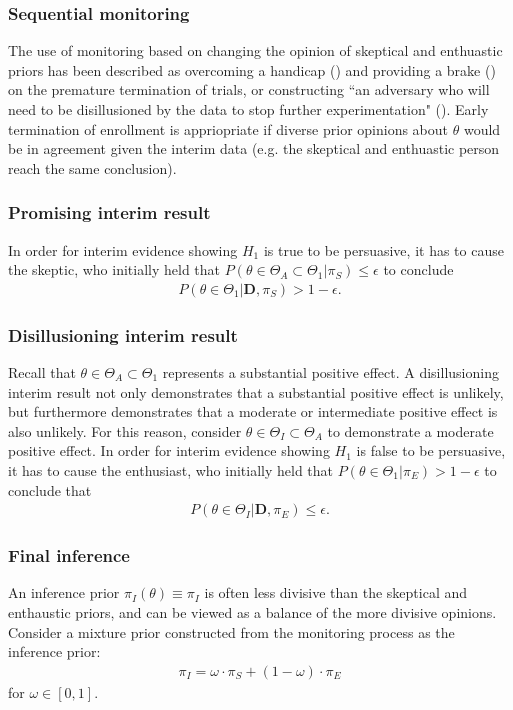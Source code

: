 \documentclass[12pt]{article}
\begin{document}
\subsubsection{Sequential monitoring}
The use of monitoring based on changing the opinion of skeptical and enthuastic priors has been described as overcoming a handicap (\cite{Freedman1989}) and providing a brake (\cite{Fayers1997}) on the premature termination of trials, or constructing ``an adversary who will need to be disillusioned by the data to stop further experimentation" (\cite{Spiegelhalter1994}). Early termination of enrollment is appriopriate if diverse prior opinions about $\theta$ would be in agreement given the interim data (e.g. the skeptical and enthuastic person reach the same conclusion). 

\subsubsection*{Promising interim result}
In order for interim evidence showing $H_1$ is true to be persuasive, it has to cause the skeptic, who initially held that $P(\theta\in\Theta_A\subset\Theta_1| \pi_{S})\leq\epsilon$ to conclude 
\begin{align}
P(\theta\in\Theta_1| \mathbf{D},\pi_{S})>1-\epsilon.
\end{align}
\subsubsection*{Disillusioning interim result}
Recall that $\theta\in\Theta_A\subset\Theta_1$ represents a substantial positive effect. A disillusioning interim result not only demonstrates that a substantial positive effect is unlikely, but furthermore demonstrates that a moderate or intermediate positive effect is also unlikely. For this reason, consider $\theta\in\Theta_I\subset\Theta_A$ to demonstrate a moderate positive effect. In order for interim evidence showing $H_1$ is false to be persuasive, it has to cause the enthusiast, who initially held that $P(\theta\in\Theta_1| \pi_{E})>1-\epsilon$ to conclude that 
\begin{align}
P(\theta\in\Theta_I| \mathbf{D},\pi_{E})\leq\epsilon.
\end{align}

\subsubsection{Final inference}
An inference prior $\pi_{I}(\theta)\equiv\pi_{I}$ is often less divisive than the skeptical and enthaustic priors, and can be viewed as a balance of the more divisive opinions. Consider a mixture prior constructed from the monitoring process as the inference prior:
\begin{align}\label{eq:inference_prior}
\pi_{I}=\omega\cdot\pi_{S}+(1-\omega)\cdot\pi_E
\end{align}
for $\omega\in[0,1]$. 
\end{document}
